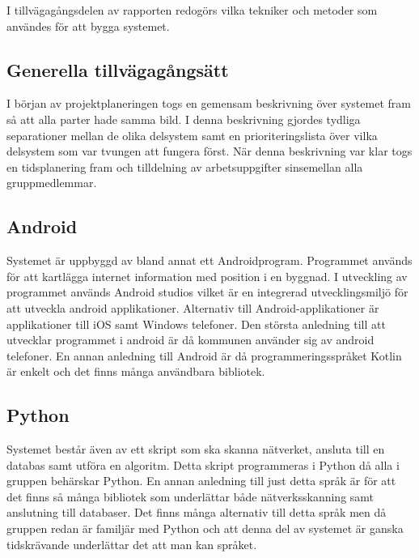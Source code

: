 \documentclass[swedish, a4paper,12pt]{article}
\begin{document}

I tillvägagångsdelen av rapporten redogörs vilka tekniker och metoder som användes för att bygga systemet.

\subsection{Generella tillvägagångsätt}
I början av projektplaneringen togs en gemensam beskrivning över systemet fram så att alla parter hade samma bild. I denna beskrivning gjordes tydliga separationer mellan de olika delsystem samt en prioriteringslista över vilka delsystem som var tvungen att fungera först. När denna beskrivning var klar togs en tidsplanering fram och tilldelning av arbetsuppgifter sinsemellan alla gruppmedlemmar.

\subsection{Android}
Systemet är uppbyggd av bland annat ett Androidprogram. Programmet används för att kartlägga internet information med position i en byggnad. I utveckling av programmet används Android studios vilket är en integrerad utvecklingsmiljö för att utveckla android applikationer. Alternativ till Android-applikationer är applikationer till iOS samt Windows telefoner. Den största anledning till att utvecklar programmet i android är då kommunen använder sig av android telefoner. En annan anledning till Android är då programmeringsspråket Kotlin är enkelt och det finns många användbara bibliotek.

\subsection{Python}
Systemet består även av ett skript som ska skanna nätverket, ansluta till en databas samt utföra en algoritm. Detta skript programmeras i Python då alla i gruppen behärskar Python. En annan anledning till just detta språk är för att det finns så många bibliotek som underlättar både nätverksskanning samt anslutning till databaser. Det finns många alternativ till detta språk men då gruppen redan är familjär med Python och att denna del av systemet är ganska tidskrävande underlättar det att man kan språket.
\end{document}
